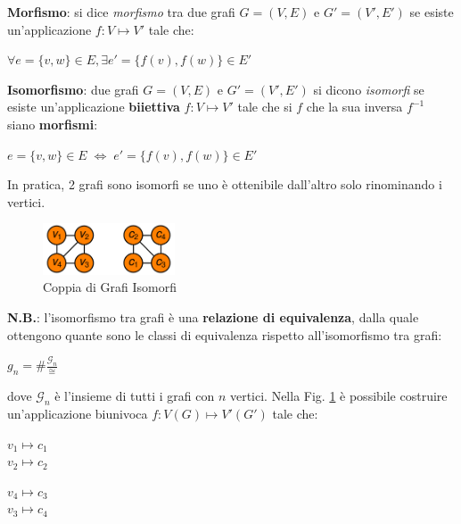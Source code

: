 \begin{flushleft}

    \textbf{Morfismo}: si dice \textit{morfismo} tra due grafi $G = (V, E)$ e $G' = (V', E')$ se esiste un'applicazione $f: V \mapsto V'$ tale che:

    {\centering
        $\forall e = \{v, w\} \in E, \exists e' = \{f(v), f(w)\} \in E'$
    \par}

    \textbf{Isomorfismo}: due grafi $G = (V, E)$ e $G' = (V', E')$ si dicono \textit{isomorfi} se esiste un'applicazione \textbf{biiettiva} $f: V \mapsto V'$ tale che si $f$ che la sua inversa $f^{-1}$ siano \textbf{morfismi}:

    {\centering
        $e = \{v, w\} \in E \; \Leftrightarrow \; e' = \{f(v), f(w)\} \in E'$
    \par}
    In pratica, 2 grafi sono isomorfi se uno è ottenibile dall'altro solo rinominando i vertici.

    \begin{figure}[h]
        \centering
        \includegraphics[width=0.35\textwidth]{img/isomorfismo}
        \caption{Coppia di Grafi Isomorfi}
        \label{fig:isomorfismo}
    \end{figure}
    \textbf{N.B.}: l'isomorfismo tra grafi è una \textbf{relazione di equivalenza}, dalla quale ottengono quante sono le classi di equivalenza rispetto all'isomorfismo tra grafi: 

    {\centering
        $g_n = \# \frac{\mathcal{G}_n}{\cong}$
    \par}
    dove $\mathcal{G}_n$ è l'insieme di tutti i grafi con $n$ vertici. Nella Fig. \ref{fig:isomorfismo} è possibile costruire un'applicazione biunivoca $f: V(G) \mapsto V'(G')$ tale che:

    {\centering
        \begin{minipage}[t]{0.45\textwidth}
            \centering
            $v_1 \mapsto c_1$ \\
            $v_2 \mapsto c_2$ \\
        \end{minipage}
        \begin{minipage}[t]{0.45\textwidth}
            \centering
            $v_4 \mapsto c_3$ \\
            $v_3 \mapsto c_4$
        \end{minipage}
    \par}
\end{flushleft}

